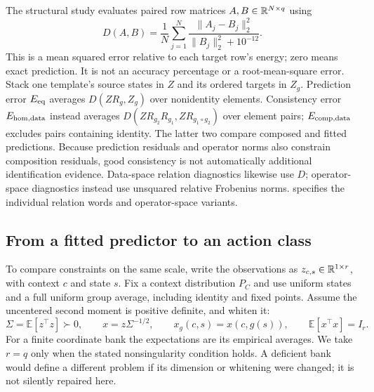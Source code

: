 The structural study evaluates paired row matrices $A,B\in\mathbb{R}^{N\times q}$ using
\begin{equation}
 D(A,B)=\frac1N\sum_{j=1}^{N}
 \frac{\|A_j-B_j\|_2^2}{\|B_j\|_2^2+10^{-12}}.
 \label{eq:D}
\end{equation}
This is a mean squared error relative to each target row's energy; zero means exact prediction. It is not an accuracy percentage or a root-mean-square error. Stack one template's source states in $Z$ and its ordered targets in $Z_g$. Prediction error $E_{\mathrm{eq}}$ averages $D(ZR_g,Z_g)$ over nonidentity elements. Consistency error $E_{\mathrm{hom,data}}$ instead averages $D(ZR_{g_2}R_{g_1},ZR_{g_1\circ g_2})$ over element pairs; $E_{\mathrm{comp,data}}$ excludes pairs containing identity. The latter two compare composed and fitted predictions. Because prediction residuals and operator norms also constrain composition residuals, good consistency is not automatically additional identification evidence. Data-space relation diagnostics likewise use $D$; operator-space diagnostics instead use unsquared relative Frobenius norms.  specifies the individual relation words and operator-space variants.

\subsection{From a fitted predictor to an action class}
To compare constraints on the same scale, write the observations as $z_{c,s}\in\mathbb{R}^{1\times r}$, with context $c$ and state $s$. Fix a context distribution $P_C$ and use uniform states and a full uniform group average, including identity and fixed points. Assume the uncentered second moment is positive definite, and whiten it:
\[
 \Sigma=\mathbb E[z^\top z]\succ0,\qquad
 x=z\Sigma^{-1/2},\qquad x_g(c,s)=x(c,g(s)),\qquad
 \mathbb E[x^\top x]=I_r.
\]
For a finite coordinate bank the expectations are its empirical averages. We take $r=q$ only when the stated nonsingularity condition holds. A deficient bank would define a different problem if its dimension or whitening were changed; it is not silently repaired here.

